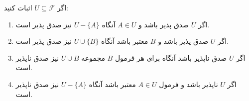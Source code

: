 \documentclass[]{exam}
\begin{document}
اگر 
$U \subseteq \mathscr{F}$
اثبات کنید:
\begin{enumerate}
    \item اگر
    $U$
    صدق پذیر باشد و 
    $A \in U$
    آنگاه
    $U - \{A\}$
    نیز صدق پذیر است.

    \item اگر
    $U$
    صدق پذیر باشد و
    $B$
    معتبر باشد آنگاه
    $U \cup \{B\}$
    نیز صدق پذیر است.

    \item اگر
    $U$
    صدق ناپذیر باشد آنگاه برای هر فرمول
    $B$
    مجموعه
    $U \cup {B}$
    نیز صدق ناپذیر است.

    \item اگر
    $U$
    ناپذیر باشد و فرمول
    $A \in U$
    معتبر باشد
    آنگاه 
    $U - \{A\}$
    نیز صدق ناپذیر است.
\end{enumerate}
\end{document}
